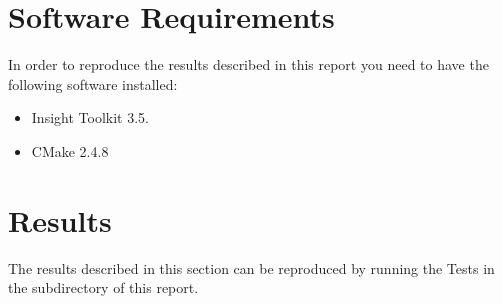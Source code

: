 \documentclass{InsightArticle}
\begin{document}
\section{Software Requirements}

In order to reproduce the results described in this report you need to have the
following software installed:

\begin{itemize}
  \item  Insight Toolkit 3.5.
  \item  CMake 2.4.8
\end{itemize}


\appendix

\section{Results}

The results described in this section can be reproduced by running the Tests in
the  subdirectory of this report.
\end{document}
